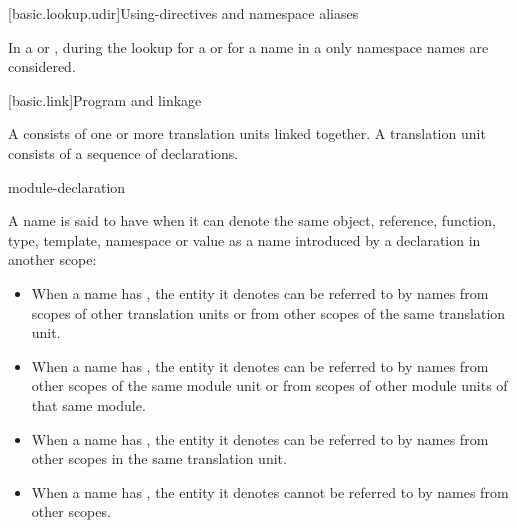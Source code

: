 [basic.lookup.udir]{Using-directives and namespace aliases}

\pnum
{}%
%
In a  or ,
during the lookup for a  or for a name in a
only namespace names are considered.%
%

[basic.link]{Program and linkage}%

\pnum
{}%
A  consists of one or more translation units
linked together. A translation unit consists
of a sequence of declarations.

\begin{bnf}
\br
    \br
     module-declaration  
\end{bnf}

\pnum
{}%
A name is said to have  when it can denote the same
object, reference, function, type, template, namespace or value as a
name introduced by a declaration in another scope:
\begin{itemize}
\item When a name has ,
the entity it denotes
can be referred to by names from scopes of other translation units or
from other scopes of the same translation unit.

\item When a name has ,
the entity it denotes
can be referred to by names from other scopes of the same module unit or
from scopes of other module units of that same module.

\item When a name has ,
the entity it denotes
can be referred to by names from other scopes in the same translation
unit.

\item When a name has , the entity it denotes
cannot be referred to by names from other scopes.
\end{itemize}

